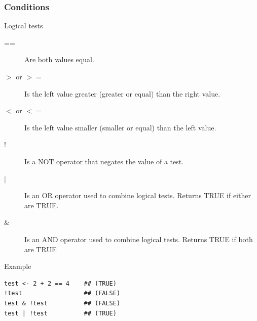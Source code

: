 \documentclass[10pt]{beamer}
\newenvironment{xframe}[2][]
  {\begin{frame}[fragile,environment=xframe,#1]
  \frametitle{#2}}
  {\end{frame}}
\begin{document}
\begin{xframe}{Conditions}
  \begin{block}{Logical tests}
	
    \begin{description}
    \item[{\sf ==}] Are both values equal.
    \item[{\sf $>$ or $>=$}] Is the left value greater (greater or equal)
    than the right value.
	\item[{\sf $<$ or $<=$}] Is the left value smaller (smaller or equal) than
	the left value.
    \item[!] Is a NOT operator that negates the value of a test.
    \item[$|$] Is an OR operator used to combine logical tests. Returns TRUE if
    either are TRUE.
    \item[\&] Is an AND operator used to combine logical tests. Returns TRUE
    if both are TRUE
    \end{description}
  \end{block}
  \begin{exampleblock}{Example}
\begin{verbatim}
test <- 2 + 2 == 4    ## (TRUE)
!test                 ## (FALSE)
test & !test          ## (FALSE)
test | !test          ## (TRUE)
\end{verbatim}  
  \end{exampleblock}
\end{xframe}

\end{document}
